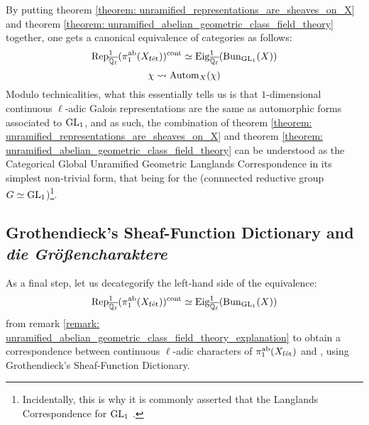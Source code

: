         \begin{remark} \label{remark: unramified_abelian_geometric_class_field_theory_explanation}
            By putting theorem \ref{theorem: unramified_representations_are_sheaves_on_X} and theorem \ref{theorem: unramified_abelian_geometric_class_field_theory} together, one gets a canonical equivalence of categories as follows:
                $$\mathrm{Rep}_{\overline{\mathbb{Q}_{\ell}}}^1(\pi_1^{\mathrm{ab}}(X_{\mathrm{f\acute{e}t}}))^{\mathrm{cont}} \simeq \mathrm{Eig}^1_{\overline{\mathbb{Q}_{\ell}}}(\mathrm{Bun}_{\operatorname{GL}_1}(X))$$
                $$\chi \leadsto \mathrm{Autom}_X(\chi)$$
            Modulo technicalities, what this essentially tells us is that $1$-dimensional continuous $\ell$-adic Galois representations are the same as automorphic forms associated to $\operatorname{GL}_1$, and as such, the combination of theorem \ref{theorem: unramified_representations_are_sheaves_on_X} and theorem \ref{theorem: unramified_abelian_geometric_class_field_theory} can be understood as the Categorical Global Unramified Geometric Langlands Correspondence in its simplest non-trivial form, that being for the (connnected reductive group $G \simeq \operatorname{GL}_1$)\footnote{Incidentally, this is why it is commonly asserted that the Langlands Correspondence for $\operatorname{GL}_1$ .}. 
        \end{remark}
        
    \subsection{Grothendieck's Sheaf-Function Dictionary and \textit{die Gr\"o{\ss}encharaktere}}
        As a final step, let us decategorify the left-hand side of the equivalence:
            $$\mathrm{Rep}_{\overline{\mathbb{Q}_{\ell}}}^1(\pi_1^{\mathrm{ab}}(X_{\mathrm{f\acute{e}t}}))^{\mathrm{cont}} \simeq \mathrm{Eig}^1_{\overline{\mathbb{Q}_{\ell}}}(\mathrm{Bun}_{\operatorname{GL}_1}(X))$$
        from remark \ref{remark: unramified_abelian_geometric_class_field_theory_explanation} to obtain a correspondence between continuous $\ell$-adic characters of $\pi_1^{\mathrm{ab}}(X_{\mathrm{f\acute{e}t}})$ and , using Grothendieck's Sheaf-Function Dictionary.